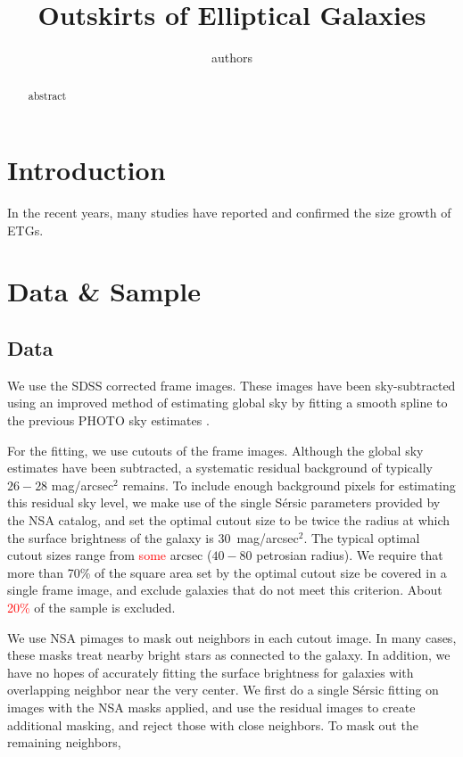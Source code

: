 \documentclass[iop]{emulateapj}
\newcommand{\Sersic}{S\'ersic}
\newcommand\todo[1]{\textcolor{red}{#1}}
\begin{document}
\title{Outskirts of Elliptical Galaxies}
\author{authors}


\begin{abstract}
    abstract    
\end{abstract}    


\section{Introduction}

In the recent years, many studies have reported and confirmed the size growth
of ETGs.

\section{Data \& Sample}

\subsection{Data}
We use the SDSS corrected frame images. These images have been
sky-subtracted using an improved method of estimating global sky by fitting
a smooth spline to the previous PHOTO sky estimates
\citep[see][for details]{blanton2011}.

For the fitting, we use cutouts of the frame images.
Although the global sky estimates have been subtracted, a systematic residual
background of typically $26-28$ mag/arcsec$^2$ remains.
To include enough background pixels for estimating this residual sky level,
we make use of the single \Sersic{} parameters provided by the NSA catalog,
and set the optimal cutout size to be twice the radius at which the surface
brightness of the galaxy is 30~mag/arcsec$^2$.
The typical optimal cutout sizes range from
\todo{some} arcsec ($40-80$ petrosian radius).
We require that more than 70\% of the square area set by the optimal cutout
size be covered in a single frame image,
and exclude galaxies that do not meet this criterion.
About \todo{20\%} of the sample is excluded.

We use NSA pimages to mask out neighbors in each cutout image.
In many cases, these masks treat nearby bright stars as connected to the galaxy.
In addition, we have no hopes of accurately fitting the surface brightness
for galaxies with overlapping neighbor near the very center.
We first do a single \Sersic{} fitting on images with the NSA masks applied,
and use the residual images to create additional masking,
and reject those with close neighbors.
To mask out the remaining neighbors, 
\end{document}
